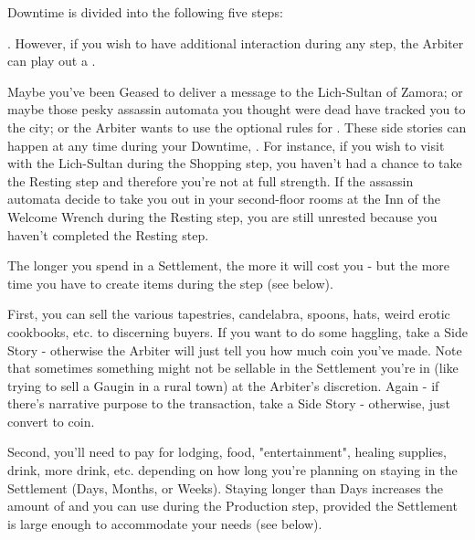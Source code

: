 \begin{multicols*}{2}

Downtime is divided into the following five steps:

\begin{center}
\end{center}


. However, if you wish to have additional interaction during any step, the Arbiter can play out a .



Maybe you've been Geased to deliver a message to the Lich-Sultan of Zamora; or maybe those pesky assassin automata you thought were dead have tracked you to the city; or the Arbiter wants to use the optional rules for .  These side stories can happen at any time during your Downtime, . For instance, if you wish to visit with the Lich-Sultan during the Shopping step, you haven't had a chance to take the Resting step and therefore you're not at full strength.  If the assassin automata decide to take you out in your second-floor rooms at the Inn of the Welcome Wrench during the Resting step, you are still unrested because you haven't completed the Resting step.

The longer you spend in a Settlement, the more it will cost you - but the more time you have to create items during the  step (see below). 


First, you can sell the various tapestries, candelabra, spoons, hats, weird erotic cookbooks, etc. to discerning buyers. If you want to do some haggling, take a Side Story - otherwise the Arbiter will just tell you how much coin you've made. Note that sometimes something might not be sellable in the Settlement you're in (like trying to sell a Gaugin in a rural town) at the Arbiter's discretion. Again - if there's narrative purpose to the transaction, take a Side Story - otherwise, just convert to coin.

Second, you'll need to pay for lodging, food, "entertainment", healing supplies, drink, more drink, etc. depending on how long you're planning on staying in the Settlement (Days, Months, or Weeks).  Staying longer than Days increases the amount of  and  you can use during the Production step, provided the Settlement is large enough to accommodate your needs (see below).


\end{multicols*}
